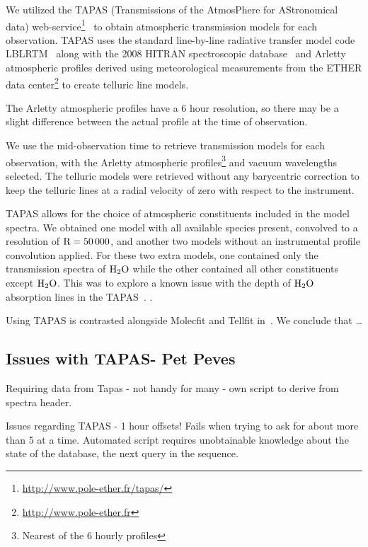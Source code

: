 We utilized the TAPAS (Transmissions of the AtmosPhere for AStronomical data) web-service\footnote{\url{http://www.pole-ether.fr/tapas/}}~\citep{bertaux_tapas_2014} to obtain atmospheric transmission models for each observation. TAPAS uses the standard line-by-line radiative transfer model code LBLRTM~\citep{clough_linebyline_1995} along with the 2008 HITRAN spectroscopic database~\citep{rothman_hitran_2009} and Arletty atmospheric profiles derived using meteorological measurements from the ETHER data center\footnote{\url{http://www.pole-ether.fr}} to create telluric line models.

The Arletty atmospheric profiles have a 6 hour resolution, so there may be a slight difference between the actual profile at the time of observation.

We use the mid-observation time to retrieve transmission models for each observation, with the Arletty atmospheric profiles\footnote{Nearest of the 6 hourly profiles} and vacuum wavelengths selected. The telluric models were retrieved without any barycentric correction to keep the telluric lines at a radial velocity of zero with respect to the instrument. 

TAPAS allows for the choice of atmospheric constituents included in the model spectra. We obtained one model with all available species present, convolved to a resolution of \(\rm R=50\,000 \), and another two models without an instrumental profile convolution applied. For these two extra models, one contained only the transmission spectra of \(\rm H_{2}O \) while the other contained all other constituents except \(\rm H_{2}O \). This was to explore a known issue with the depth of \(\rm H_{2}O \) absorption lines in the TAPAS~\citet{bertaux_tapas_2014}. .



Using TAPAS is contrasted alongside Molecfit and Tellfit in~\cite{ulmer-moll_telluric_2018}. We conclude that \ldots

\subsection{Issues with TAPAS-  Pet Peves}
Requiring data from Tapas
- not handy for many
- own script to derive from spectra header.

Issues regarding TAPAS - 1 hour offsets!
Fails when trying to ask for about more than 5 at a time.
Automated script requires unobtainable knowledge about the state of the database, the next query in the sequence. 


